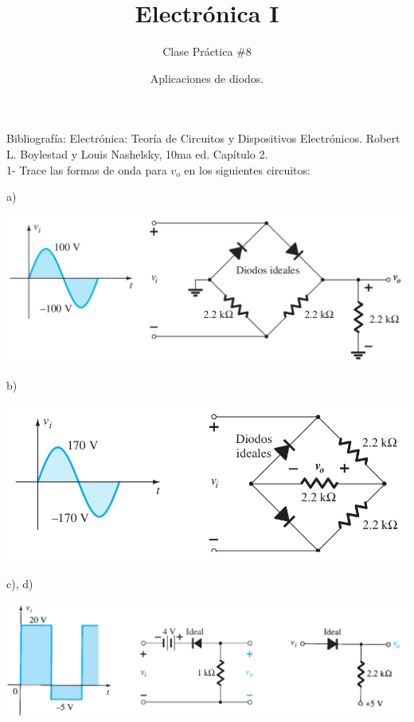 \documentclass[10pt,letterpaper]{article}
\author{Clase Práctica $\#$8}
\title{Electrónica I}
\date{Aplicaciones de diodos.}
\begin{document}
	\maketitle
	
Bibliografía: Electrónica: Teoría de Circuitos y Dispositivos Electrónicos. Robert L. Boylestad y Louis Nashelsky, 10ma ed. Capítulo 2.
\\

1- Trace las formas de onda para $v_o$ en los siguientes circuitos:

\begin{minipage}{8cm}
a)

	\includegraphics[scale=0.4]{c11.png} 
\end{minipage}

\begin{minipage}{8cm}
b)

	\includegraphics[scale=0.45]{c12.png}
\end{minipage}

\begin{minipage}{8cm}
	c), d)
	
	\includegraphics[scale=0.45]{c13.png}
\end{minipage}
\end{document}
